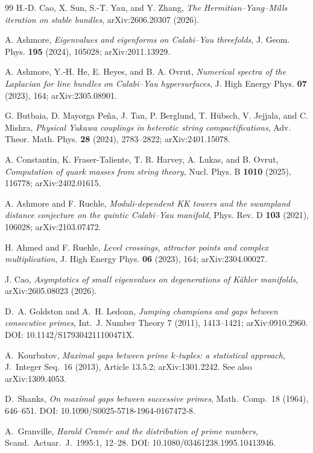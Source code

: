 \documentclass[11pt]{article}
\theoremstyle{definition}
\begin{document}
\begin{thebibliography}{99}
 H.-D. Cao, X. Sun, S.-T. Yau, and Y. Zhang, \emph{The Hermitian--Yang--Mills iteration on stable bundles}, arXiv:2606.20307 (2026).

 A. Ashmore, \emph{Eigenvalues and eigenforms on Calabi--Yau threefolds}, J. Geom. Phys. \textbf{195} (2024), 105028; arXiv:2011.13929.

 A. Ashmore, Y.-H. He, E. Heyes, and B. A. Ovrut, \emph{Numerical spectra of the Laplacian for line bundles on Calabi--Yau hypersurfaces}, J. High Energy Phys. \textbf{07} (2023), 164; arXiv:2305.08901.

 G. Butbaia, D. Mayorga Pe\~na, J. Tan, P. Berglund, T. H\"ubsch, V. Jejjala, and C. Mishra, \emph{Physical Yukawa couplings in heterotic string compactifications}, Adv. Theor. Math. Phys. \textbf{28} (2024), 2783--2822; arXiv:2401.15078.

 A. Constantin, K. Fraser-Taliente, T. R. Harvey, A. Lukas, and B. Ovrut, \emph{Computation of quark masses from string theory}, Nucl. Phys. B \textbf{1010} (2025), 116778; arXiv:2402.01615.

 A. Ashmore and F. Ruehle, \emph{Moduli-dependent KK towers and the swampland distance conjecture on the quintic Calabi--Yau manifold}, Phys. Rev. D \textbf{103} (2021), 106028; arXiv:2103.07472.

 H. Ahmed and F. Ruehle, \emph{Level crossings, attractor points and complex multiplication}, J. High Energy Phys. \textbf{06} (2023), 164; arXiv:2304.00027.

 J. Cao, \emph{Asymptotics of small eigenvalues on degenerations of K\"ahler manifolds}, arXiv:2605.08023 (2026).

 D.~A. Goldston and A.~H. Ledoan,
\emph{Jumping champions and gaps between consecutive primes},
Int.\ J. Number Theory 7 (2011), 1413--1421; arXiv:0910.2960.
DOI: 10.1142/S179304211100471X.

 A.~Kourbatov,
\emph{Maximal gaps between prime $k$-tuples: a statistical approach},
J.~Integer Seq.\ 16 (2013), Article 13.5.2; arXiv:1301.2242.  See also
arXiv:1309.4053.

 D.~Shanks,
\emph{On maximal gaps between successive primes},
Math.\ Comp.\ 18 (1964), 646--651.
DOI: 10.1090/S0025-5718-1964-0167472-8.

 A.~Granville,
\emph{Harald Cram\'er and the distribution of prime numbers},
Scand.\ Actuar.\ J.\ 1995:1, 12--28.
DOI: 10.1080/03461238.1995.10413946.


\end{thebibliography}
\end{document}
